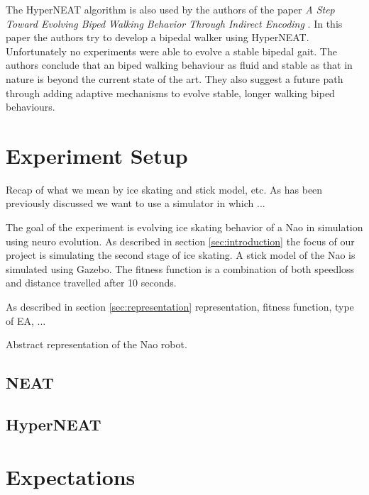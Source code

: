 \documentclass[10pt]{article}
\begin{document}
The HyperNEAT algorithm is also used by the authors of the paper \emph{A Step Toward Evolving Biped Walking Behavior Through Indirect Encoding} \cite{steptowardevolvingbipedwalkingbehavior}. In this paper the authors try to develop a bipedal walker using HyperNEAT. Unfortunately no experiments were able to evolve a stable bipedal gait. The authors conclude that an biped walking behaviour as fluid and stable as that in nature is beyond the current state of the art. They also suggest a future path through adding adaptive mechanisms to evolve stable, longer walking biped behaviours. 

\section{Experiment Setup}

Recap of what we mean by ice skating and stick model, etc.
As has been previously discussed we want to use a simulator in which ...

The goal of the experiment is evolving ice skating behavior of a Nao in simulation using neuro evolution. As described in section \ref{sec:introduction} the focus of our project is simulating the second stage of ice skating. A stick model of the Nao is simulated using Gazebo. The fitness function is a combination of both speedloss and distance travelled after 10 seconds. 

As described in section \ref{sec:representation}
representation, fitness function,
type of EA, ...

Abstract representation of the Nao robot.

\subsection{NEAT}

\subsection{HyperNEAT}

\section{Expectations}



\end{document}
